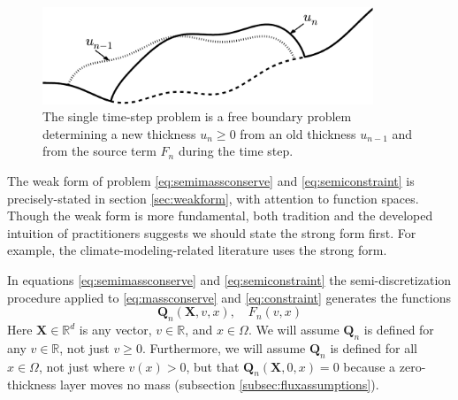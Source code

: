 \documentclass[final,leqno,onefignum,onetabnum]{siamltex1213bueler}
\newcommand\bQ{\mathbf{Q}}
\newcommand\bX{\mathbf{X}}
\newcommand\RR{\mathbb{R}}
\begin{document}
\begin{figure}[ht]
\begin{center}
\includegraphics[width=3.9in,keepaspectratio=true]{time-step-cartoon}
\end{center}
\caption{The single time-step problem is a free boundary problem determining a new thickness $u_n\ge 0$ from an old thickness $u_{n-1}$ and from the source term $F_n$ during the time step.}
\label{fig:timestepcartoon}
\end{figure}

The weak form of problem \eqref{eq:semimassconserve} and \eqref{eq:semiconstraint} is precisely-stated in section \ref{sec:weakform}, with attention to function spaces.  Though the weak form is more fundamental, both tradition and the developed intuition of practitioners suggests we should state the strong form first.  For example, the climate-modeling-related literature uses the strong form.

In equations \eqref{eq:semimassconserve} and \eqref{eq:semiconstraint} the semi-discretization procedure applied to \eqref{eq:massconserve} and \eqref{eq:constraint} generates the functions
\begin{equation}
\bQ_n(\bX,v,x), \quad F_n(v,x) \label{eq:functionalforms}
\end{equation}
Here $\bX\in\RR^d$ is any vector, $v\in\RR$, and $x\in \Omega$.  We will assume $\bQ_n$ is defined for any $v\in\RR$, not just $v\ge 0$.  Furthermore, we will assume $\bQ_n$ is defined for all $x\in\Omega$, not just where $v(x)>0$, but that $\bQ_n(\bX,0,x)=0$ because a zero-thickness layer moves no mass (subsection \ref{subsec:fluxassumptions}).
\end{document}
